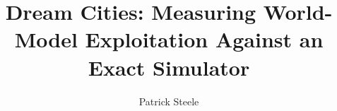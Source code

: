\documentclass{hyperprior}
\title{Dream Cities: Measuring World-Model Exploitation Against an Exact Simulator}
\author{Patrick Steele}
\affiliation{HyperPrior Research, London}
\date{\FinishingDate}
\begin{document}
\maketitle











\clearpage\onecolumn\appendix

\end{document}
